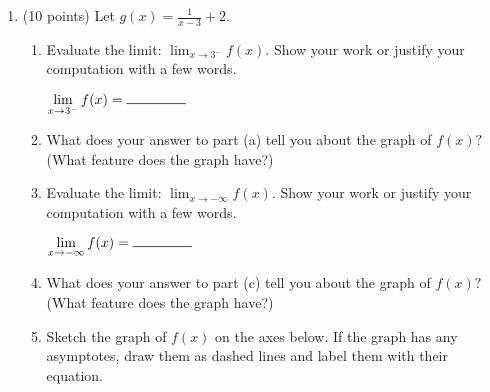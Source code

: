 \documentclass[11pt]{article}
\renewcommand{\d}{\displaystyle}
\begin{document}
\begin{enumerate}
%
%
%

\item (10 points) Let $g(x)=\frac{1}{x-3}+2.$
	\begin{enumerate}
	

		\item Evaluate the limit: $\d{\lim_{x \to 3^-} f(x)}.$  Show your work or justify your computation with a few words.	
	\vfill
	
	\hfill $\d{\lim_{x \to 3^-} f(x)} = \ans$
	
	\bigskip
	
	\item What does your answer to part (a) tell you about the graph of $f(x)?$ (What feature does the graph have?)
	\vspace{0.5in}
	\item Evaluate the limit: $\d{\lim_{x \to - \infty} f(x)}.$  Show your work or justify your computation with a few words.
	
		\vfill
		
		\hfill$\d{\lim_{x \to - \infty} f(x)} = \ans$
		
		\bigskip
	\item What does your answer to part (c) tell you about the graph of $f(x)?$ (What feature does the graph have?)
	\vspace{0.5in}
	
	\item Sketch the graph of $f(x)$ on the axes below. If the graph has any asymptotes, draw them as dashed lines and label them with their equation. \\
	
\vspace{.25in}
	

\end{enumerate}
\end{enumerate}
\end{document}
